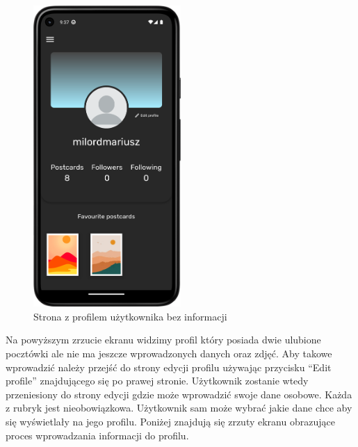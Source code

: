 \documentclass[a4paper,twoside,12pt]{book}
\begin{document}
\begin{figure}[H]
    \centering
    \includegraphics[width=0.5\textwidth]{mobile_ss/profil_bez_info.png}
    \caption{Strona z profilem użytkownika bez informacji}
\end{figure}

Na powyższym zrzucie ekranu widzimy profil który posiada dwie ulubione pocztówki ale nie ma jeszcze wprowadzonych danych oraz zdjęć. Aby takowe wprowadzić należy przejść do strony edycji profilu używając przycisku ``Edit profile'' znajdującego się po prawej stronie. Użytkownik zostanie wtedy przeniesiony do strony edycji gdzie może wprowadzić swoje dane osobowe. Każda z rubryk jest nieobowiązkowa. Użytkownik sam może wybrać jakie dane chce aby się wyświetlały na jego profilu. Poniżej znajdują się zrzuty ekranu obrazujące proces wprowadzania informacji do profilu.
\end{document}
